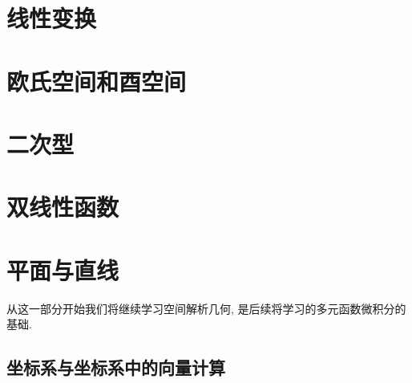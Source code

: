 \documentclass[cn,toc=twocol]{elegantbook}
\begin{document}

\chapter{线性变换}


\chapter{欧氏空间和酉空间}


\chapter{二次型}


\chapter{双线性函数}




\chapter{平面与直线}

从这一部分开始我们将继续学习空间解析几何, 是后续将学习的多元函数微积分的基础.

\section{坐标系与坐标系中的向量计算}
\end{document}
